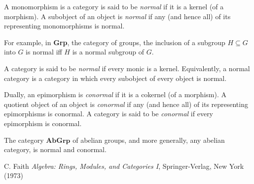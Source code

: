 \documentclass[12pt]{article}
\begin{document}
A monomorphism is a category is said to be \emph{normal} if it is a kernel (of a morphism).  A subobject of an object is \emph{normal} if any (and hence all) of its representing monomorphisms is normal.

For example, in \textbf{Grp}, the category of groups, the inclusion of a subgroup $H\subseteq G$ into $G$ is normal iff $H$ is a normal subgroup of $G$.

A category is said to be \emph{normal} if every monic is a kernel.  Equivalently, a normal category is a category in which every subobject of every object is normal.

Dually, an epimorphism is \emph{conormal} if it is a cokernel (of a morphism).  A quotient object of an object is \emph{conormal} if any (and hence all) of its representing epimorphisms is conormal.  A category is said to be \emph{conormal} if every epimorphism is conormal.

The category $\textbf{AbGrp}$ of abelian groups, and more generally, any abelian category, is normal and conormal.

\begin{thebibliography}{9}
 C. Faith \emph{Algebra: Rings, Modules, and Categories I}, Springer-Verlag, New York (1973)
\end{thebibliography}
\end{document}
